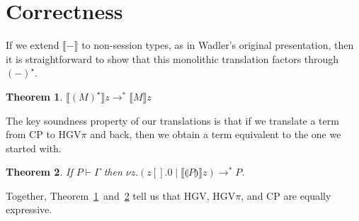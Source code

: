 \documentclass{easychair}
\makeatletter
\newtheorem{theorem}{Theorem}
\newcommand{\ba}{\begin{array}}
\newcommand{\ea}{\end{array}}
\newenvironment{equations}{\[\ba{@{}r@{~}c@{~}l@{}}}{\ea\]}
\newcommand{\cptogv}[1]{\llparenthesis{#1}\rrparenthesis}
\newcommand{\cpj}[2]{{#1} \vdash {#2}}
\newcommand{\gvj}[3]{{#1} \vdash {#2} : {#3}}
\newcommand{\G}{\Gamma}
\newcommand{\cpCut}[3]{\nu {#1}.({#2} \mid {#3})}
\newcommand{\cpEmptyOut}[1]{{#1}[].0}
\newcommand{\cpDual}[1]{{#1}^\bot}
\newcommand{\hgv}{HGV\xspace}
\newcommand{\hgvpi}{HGV$\pi$\xspace}
\newcommand{\lampi}[1]{({#1})^\star}
\newcommand{\hgvcp}[1]{\llbracket{#1}\rrbracket}
\newcommand{\redto}{\longrightarrow}
\makeatother
\begin{document}
\section{Correctness}

If we extend $\hgvcp{-}$ to non-session types, as in Wadler's original presentation, then it is
straightforward to show that this monolithic translation factors through $\lampi{-}$.
\begin{theorem}
\label{th:factor}
$\hgvcp{\lampi{M}}z \redto^* \hgvcp{M}z$
\end{theorem}
\noindent
The key soundness property of our translations is that if we translate a term from CP to \hgvpi and
back, then we obtain a term equivalent to the one we started with.
\begin{theorem}
\label{th:soundness}
If $\cpj{P}{\G}$ then $\cpCut{z}{\cpEmptyOut{z}}{\hgvcp{\cptogv{P}}z} \redto^* P$.
\end{theorem}
\noindent
Together, Theorem~\ref{th:factor}~and~\ref{th:soundness} tell us that \hgv, \hgvpi, and CP are
equally expressive.



%





\end{document}
